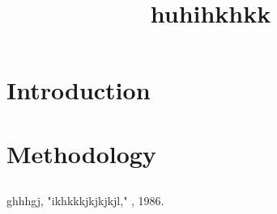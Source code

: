 \documentclass[conference,onecolumn]{IEEEtran}
\date{}
\begin{document}
\title{huhihkhkk}
\author{
}
\maketitle
\begin{abstract}
 
\end{abstract}

\IEEEpeerreviewmaketitle
\section{Introduction}
\cite{one}

\section{Methodology}
\subsection{}


\begin{thebibliography}{10}
ghhhgj, 
\newblock "ikhkkkjkjkjkjl,"
, 1986.





\end{thebibliography}
\end{document}
